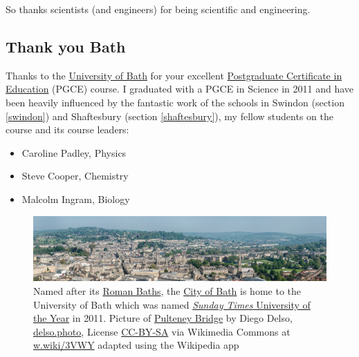\documentclass[
]{book}
\providecommand{\tightlist}{%
  \setlength{\itemsep}{0pt}\setlength{\parskip}{0pt}}
\begin{document}
So thanks scientists (and engineers) for being scientific and engineering. 🙏

\hypertarget{bath}{%
\subsection{Thank you Bath}\label{bath}}

Thanks to the \href{https://en.wikipedia.org/wiki/University_of_Bath}{University of Bath} for your excellent \href{https://en.wikipedia.org/wiki/Postgraduate_Certificate_in_Education}{Postgraduate Certificate in Education} (PGCE) course. I graduated with a PGCE in Science in 2011 and have been heavily influenced by the fantastic work of the schools in Swindon (section \ref{swindon}) and Shaftesbury (section \ref{shaftesbury}), my fellow students on the course and its course leaders:

\begin{itemize}
\tightlist
\item
  Caroline Padley, Physics
\item
  Steve Cooper, Chemistry
\item
  Malcolm Ingram, Biology
\end{itemize}

\begin{figure}

{\centering \includegraphics[width=1\linewidth]{images/bath-panorama} 

}

\caption{Named after its \href{https://en.wikipedia.org/wiki/Roman_Baths_(Bath)}{Roman Baths}, the \href{https://en.wikipedia.org/wiki/Bath,_Somerset}{City of Bath} is home to the University of Bath which was named \href{https://en.wikipedia.org/wiki/Sunday_Times_University_of_the_Year}{\emph{Sunday Times} University of the Year} in 2011. Picture of \href{https://en.wikipedia.org/wiki/Pulteney_Bridge}{Pulteney Bridge} by Diego Delso, \href{http://delso.photo/}{delso.photo}, License \href{https://creativecommons.org/licenses/by-sa/4.0/legalcode}{CC-BY-SA} via Wikimedia Commons at \href{https://w.wiki/3VWY}{w.wiki/3VWY} adapted using the Wikipedia app}\label{fig:bath-fig}
\end{figure}
\end{document}
